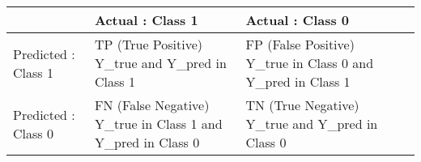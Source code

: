 \documentclass[10pt,a4paper]{article}
\theoremstyle{break}
\begin{document}
\begin{longtable}[]{@{}lllll@{}}
\toprule
\begin{minipage}[b]{0.14\columnwidth}\raggedright
\strut
\end{minipage} & \begin{minipage}[b]{0.34\columnwidth}\raggedright
Actual : Class 1\strut
\end{minipage} & \begin{minipage}[b]{0.34\columnwidth}\raggedright
Actual : Class 0\strut
\end{minipage} & \begin{minipage}[b]{0.02\columnwidth}\raggedright
\strut
\end{minipage} & \begin{minipage}[b]{0.02\columnwidth}\raggedright
\strut
\end{minipage}\tabularnewline
\midrule
\endhead
\begin{minipage}[t]{0.14\columnwidth}\raggedright
Predicted : Class 1\strut
\end{minipage} & \begin{minipage}[t]{0.34\columnwidth}\raggedright
TP (True Positive) Y\_true and Y\_pred in Class 1\strut
\end{minipage} & \begin{minipage}[t]{0.34\columnwidth}\raggedright
FP (False Positive) Y\_true in Class 0 and Y\_pred in Class 1\strut
\end{minipage} & \begin{minipage}[t]{0.02\columnwidth}\raggedright
\strut
\end{minipage} & \begin{minipage}[t]{0.02\columnwidth}\raggedright
\strut
\end{minipage}\tabularnewline
\begin{minipage}[t]{0.14\columnwidth}\raggedright
Predicted : Class 0\strut
\end{minipage} & \begin{minipage}[t]{0.34\columnwidth}\raggedright
FN (False Negative) Y\_true in Class 1 and Y\_pred in Class 0\strut
\end{minipage} & \begin{minipage}[t]{0.34\columnwidth}\raggedright
TN (True Negative) Y\_true and Y\_pred in Class 0\strut
\end{minipage} & \begin{minipage}[t]{0.02\columnwidth}\raggedright
\strut
\end{minipage} & \begin{minipage}[t]{0.02\columnwidth}\raggedright
\strut
\end{minipage}\tabularnewline
\bottomrule
\end{longtable}
\end{document}
